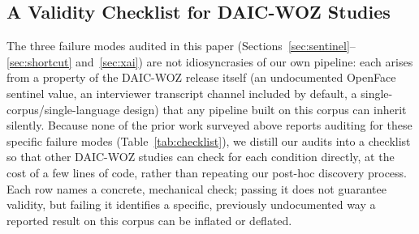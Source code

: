 \documentclass[5p,twocolumn]{elsarticle}
\begin{document}
\subsection{A Validity Checklist for DAIC-WOZ Studies}
\label{sec:checklist}

The three failure modes audited in this paper (Sections~\ref{sec:sentinel}--\ref{sec:shortcut}
and~\ref{sec:xai}) are not idiosyncrasies of our own pipeline: each
arises from a property of the DAIC-WOZ release itself (an
undocumented OpenFace sentinel value, an interviewer transcript
channel included by default, a single-corpus/single-language design)
that any pipeline built on this corpus can inherit silently. Because
none of the prior work surveyed above reports auditing for these
specific failure modes (Table~\ref{tab:checklist}), we distill our
audits into a checklist so that other DAIC-WOZ studies can check for
each condition directly, at the cost of a few lines of code, rather
than repeating our post-hoc discovery process. Each row names a
concrete, mechanical check; passing it does not guarantee validity,
but failing it identifies a specific, previously undocumented way a
reported result on this corpus can be inflated or deflated.
\end{document}
